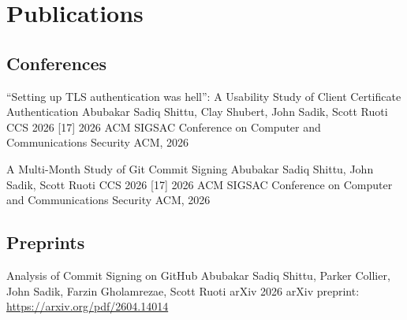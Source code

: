 
\section{Publications}

\subsection{Conferences}
\begin{publications}[C]
	
	\proceedings
		{``Setting up TLS authentication was hell'': A Usability Study of Client Certificate Authentication}
		{Abubakar Sadiq Shittu, Clay Shubert, John Sadik, Scott Ruoti}
		{CCS 2026}
		[17]
		{2026 ACM SIGSAC Conference on Computer and Communications Security}
		{ACM, 2026}
	
	\proceedings
		{A Multi-Month Study of Git Commit Signing}
		{Abubakar Sadiq Shittu, John Sadik, Scott Ruoti}
		{CCS 2026}
		[17]
		{2026 ACM SIGSAC Conference on Computer and Communications Security}
		{ACM, 2026}
		
	

\end{publications}


\subsection{Preprints}
\begin{publications}[PR]
	\preprint
		{Analysis of Commit Signing on GitHub}
		{Abubakar Sadiq Shittu, Parker Collier, John Sadik, Farzin Gholamrezae, Scott Ruoti}
		{arXiv 2026}
		{arXiv preprint: \href{https://arxiv.org/pdf/2604.14014}{https://arxiv.org/pdf/2604.14014}}
\end{publications}








